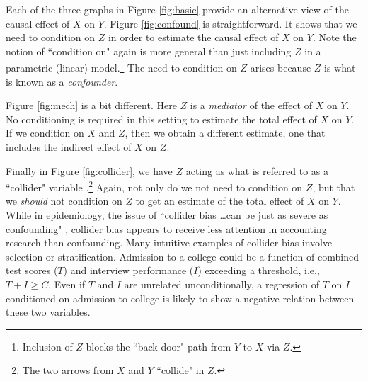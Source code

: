 \documentclass[12pt,reqno,titlepage]{amsart}
\theoremstyle{definition}
\begin{document}
\begin{doublespace}
Each of the three graphs in Figure \ref{fig:basic} provide an alternative view of the causal effect of $X$ on $Y$.	
Figure \ref{fig:confound} is straightforward. 
It shows that we need to condition on $Z$ in order to estimate the causal effect of $X$ on $Y$.
Note the notion of ``condition on" again is more general than just including $Z$ in a parametric (linear) model.\footnote{
Inclusion of $Z$ blocks the ``back-door" path from $Y$ to $X$ via $Z$.} The need to condition on $Z$ arises because $Z$ is what is known as a \emph{confounder}.


Figure \ref{fig:mech} is a bit different. Here $Z$ is a \emph{mediator} of the effect of $X$ on $Y$.
No conditioning is required in this setting to estimate the total effect of $X$ on $Y$. If we condition on $X$ and $Z$, then we 
obtain a different estimate, one that includes the indirect effect of $X$ on $Z$.

Finally in Figure \ref{fig:collider}, we have $Z$ acting as what is referred to as a ``collider" variable \citep{Glymour:2008aa,Pearl:2009kh}.\footnote{
The two arrows from $X$ and $Y$ ``collide" in $Z$.} 
Again, not only do we not need to condition on $Z$, but that we \emph{should} not condition on $Z$ to get an estimate of the total effect of $X$ on $Y$.
While in epidemiology, the issue of ``collider bias \dots can be just as severe as confounding" \citep[p.\,186]{Glymour:2008aa}, collider bias appears to receive less attention in accounting research than confounding.
Many intuitive examples of collider bias involve selection or stratification.
Admission to a college could be a function of combined test scores 
($T$) and interview performance ($I$) exceeding a threshold, i.e., $T + I \geq C$. 
Even if $T$ and $I$ are unrelated unconditionally, a regression of $T$ on $I$ conditioned on admission to college is likely to show a negative relation between these two variables.


\end{doublespace}
\end{document}
